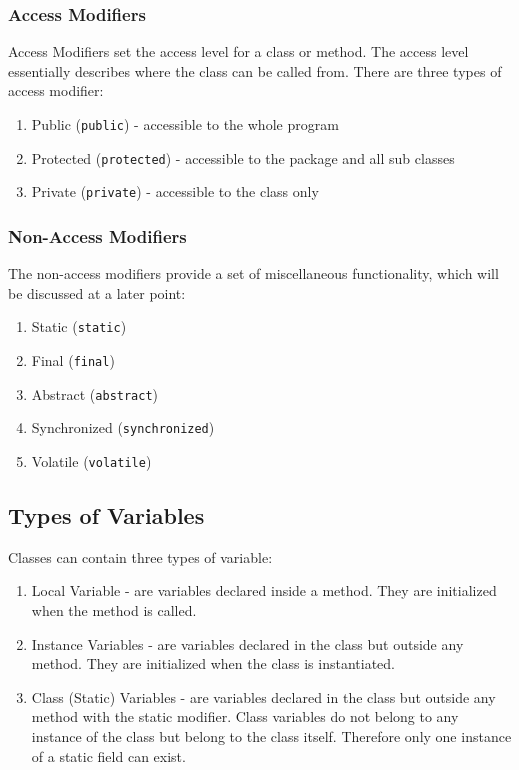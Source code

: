 \documentclass[a4paper]{article}
\begin{document}
\subsubsection*{Access Modifiers}

Access Modifiers set the access level for a class or method. The access level essentially describes where the class can be called from. There are three types of access modifier:

\begin{enumerate}

\item Public (\texttt{{\color{blue}public}}) - accessible to the whole program
\item Protected (\texttt{{\color{blue}protected}}) - accessible to the package and all sub classes
\item Private (\texttt{{\color{blue}private}}) - accessible to the class only 

\end{enumerate}

\subsubsection*{Non-Access Modifiers}
The non-access modifiers provide a set of miscellaneous functionality, which will be discussed at a later point:

\begin{enumerate}
\item Static (\texttt{{\color{blue}static}})
\item Final (\texttt{{\color{blue}final}})
\item Abstract (\texttt{{\color{blue}abstract}})
\item Synchronized (\texttt{{\color{blue}synchronized}})
\item Volatile (\texttt{{\color{blue}volatile}})
\end{enumerate}


\subsection*{Types of Variables}
Classes can contain three types of variable:

\begin{enumerate}

\item Local Variable - are variables declared inside a method. They are initialized when the method is called.
\item Instance Variables - are variables declared in the class but outside any method. They are initialized when the class is instantiated.
\item Class (Static) Variables -  are variables declared in the class but outside any method with the static modifier. Class variables do not belong to any instance of the class but belong to the class itself. Therefore only one instance of a static field can exist.

\end{enumerate}
\end{document}
